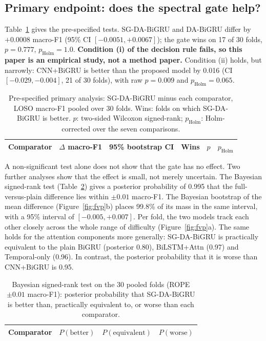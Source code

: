 \documentclass[11pt,a4paper]{article}
\begin{document}
\subsection{Primary endpoint: does the spectral gate help?}
\label{sec:primary}
Table~\ref{tab:sig} gives the pre-specified tests. SG-DA-BiGRU and DA-BiGRU differ by $+0.0008$ macro-F1 (95\% CI $[-0.0051, +0.0067]$); the gate wins on 17 of 30 folds, $p=0.777$, $p_\text{Holm}=1.0$. \textbf{Condition (i) of the decision rule fails, so this paper is an empirical study, not a method paper.} Condition (ii) holds, but narrowly: CNN+BiGRU is better than the proposed model by 0.016 (CI $[-0.029, -0.004]$, 21 of 30 folds), with raw $p=0.009$ and $p_\text{Holm}=0.065$.

\begin{table}[!htbp]
\centering
\caption{Pre-specified primary analysis: SG-DA-BiGRU minus each comparator, LOSO macro-F1 pooled over 30 folds. Wins: folds on which SG-DA-BiGRU is better. $p$: two-sided Wilcoxon signed-rank; $p_\text{Holm}$: Holm-corrected over the seven comparisons.}
\label{tab:sig}
\small
\begin{tabular}{lccccc}
\toprule
Comparator & $\Delta$ macro-F1 & 95\% bootstrap CI & Wins & $p$ & $p_\text{Holm}$ \\
\midrule

\bottomrule
\end{tabular}
\end{table}

A non-significant test alone does not show that the gate has no effect. Two further analyses show that the effect is small, not merely uncertain. The Bayesian signed-rank test (Table~\ref{tab:bayes}) gives a posterior probability of 0.995 that the full-versus-plain difference lies within $\pm0.01$ macro-F1. The Bayesian bootstrap of the mean difference (Figure~\ref{fig:fvp}b) places 99.8\% of its mass in the same interval, with a 95\% interval of $[-0.005, +0.007]$. Per fold, the two models track each other closely across the whole range of difficulty (Figure~\ref{fig:fvp}a). The same holds for the attention components more generally: SG-DA-BiGRU is practically equivalent to the plain BiGRU (posterior 0.80), BiLSTM+Attn (0.97) and Temporal-only (0.96). In contrast, the posterior probability that it is worse than CNN+BiGRU is 0.95.

\begin{table}[!htbp]
\centering
\caption{Bayesian signed-rank test \cite{benavoli2017time} on the 30 pooled folds (ROPE $\pm0.01$ macro-F1): posterior probability that SG-DA-BiGRU is better than, practically equivalent to, or worse than each comparator.}
\label{tab:bayes}
\small
\begin{tabular}{lccc}
\toprule
Comparator & $P(\text{better})$ & $P(\text{equivalent})$ & $P(\text{worse})$ \\
\midrule

\bottomrule
\end{tabular}
\end{table}
\end{document}
